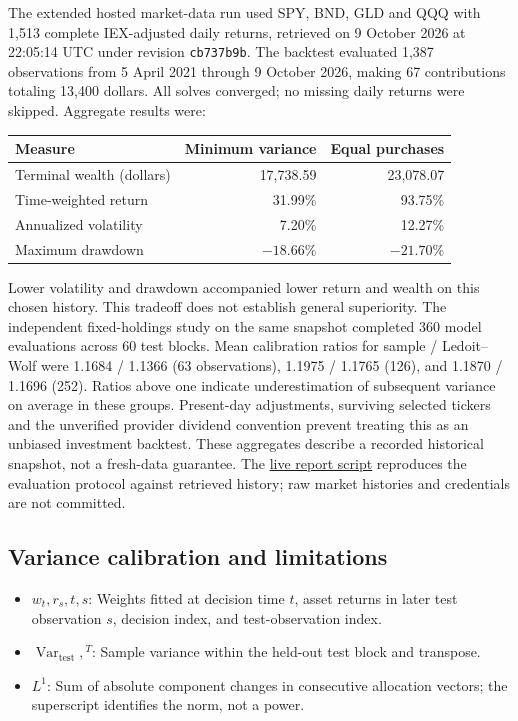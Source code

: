 \documentclass[
  american,
  11pt,
]{article}
\begin{document}
The extended hosted market-data run used SPY, BND, GLD and QQQ with 1,513
complete IEX-adjusted daily returns, retrieved on 9 October 2026 at
22:05:14 UTC under revision \texttt{cb737b9b}. The backtest evaluated 1,387
observations from 5 April 2021 through 9 October 2026, making 67 contributions
totaling 13,400 dollars. All solves converged; no missing daily returns were
skipped. Aggregate results were:
\begin{center}
\begin{tabular}{lrr}
\toprule
Measure & Minimum variance & Equal purchases \\
\midrule
Terminal wealth (dollars) & 17,738.59 & 23,078.07 \\
Time-weighted return & 31.99\% & 93.75\% \\
Annualized volatility & 7.20\% & 12.27\% \\
Maximum drawdown & $-18.66\%$ & $-21.70\%$ \\
\bottomrule
\end{tabular}
\end{center}
Lower volatility and drawdown accompanied lower return and wealth on this
chosen history. This tradeoff does not establish general superiority.
The independent fixed-holdings study on the same snapshot completed 360
model evaluations across 60 test blocks. Mean calibration ratios for sample
/ Ledoit--Wolf were 1.1684 / 1.1366 (63 observations), 1.1975 / 1.1765 (126),
and 1.1870 / 1.1696 (252). Ratios above one indicate underestimation of
subsequent variance on average in these groups. Present-day adjustments,
surviving selected tickers and the unverified provider dividend convention
prevent treating this as an unbiased investment backtest. These aggregates describe a recorded historical snapshot, not a fresh-data guarantee.
The \href{https://github.com/eshangark/portfolio-risk-engine/blob/main/examples/live_report.py}{live report script}
reproduces the evaluation protocol against retrieved history; raw market histories
and credentials are not committed.

\subsection*{Variance calibration and limitations}
\begin{itemize}
\item \(w_t,r_s,t,s\): Weights fitted at decision time $t$, asset returns in later test observation $s$, decision index, and test-observation index.
\item \(\operatorname{Var}_{\mathrm{test}},{}^T\): Sample variance within the held-out test block and transpose.
\item \(L^1\): Sum of absolute component changes in consecutive allocation vectors; the superscript identifies the norm, not a power.
\end{itemize}
\end{document}
